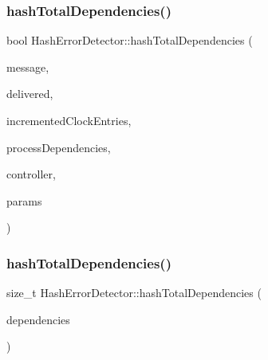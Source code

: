 \subsubsection{\texorpdfstring{hash\+Total\+Dependencies()}{hashTotalDependencies()}\hspace{0.1cm}{\footnotesize\ttfamily [1/2]}}
{\footnotesize\ttfamily bool Hash\+Error\+Detector\+::hash\+Total\+Dependencies (\begin{DoxyParamCaption}\item[{const \hyperlink{structures_8h_a7e7bdc1d2fff8a9436f2f352b2711ed6}{message\+Info} \&}]{message,  }\item[{const vector$<$ \hyperlink{structures_8h_a7e7bdc1d2fff8a9436f2f352b2711ed6}{message\+Info} $>$ \&}]{delivered,  }\item[{const vector$<$ unsigned int $>$ \&}]{incremented\+Clock\+Entries,  }\item[{const \hyperlink{classTotalDependencies}{Total\+Dependencies} \&}]{process\+Dependencies,  }\item[{\hyperlink{classController}{Controller} $\ast$}]{controller,  }\item[{\hyperlink{classSimulationParameters}{Simulation\+Parameters} $\ast$}]{params }\end{DoxyParamCaption})}

\mbox{\label{classHashErrorDetector_afcad668b4f0ca1c838b40a3c0584c1ee}} 
\subsubsection{\texorpdfstring{hash\+Total\+Dependencies()}{hashTotalDependencies()}\hspace{0.1cm}{\footnotesize\ttfamily [2/2]}}
{\footnotesize\ttfamily size\+\_\+t Hash\+Error\+Detector\+::hash\+Total\+Dependencies (\begin{DoxyParamCaption}\item[{const \hyperlink{classTotalDependencies}{Total\+Dependencies} \&}]{dependencies }\end{DoxyParamCaption})}

\mbox{\label{classHashErrorDetector_a08b4518822a6beff6845da4dd36bfba1}} 
